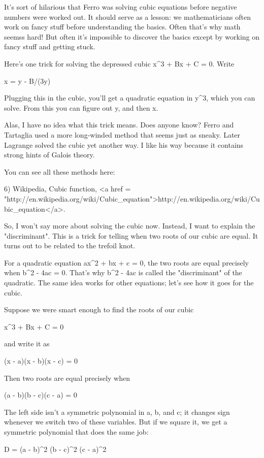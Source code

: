 It's sort of hilarious that Ferro was solving cubic equations before 
negative numbers were worked out.  It should serve as a lesson: we 
mathematicians often work on fancy stuff before understanding the 
basics.  Often that's why math seemss hard!  But often it's impossible 
to discover the basics except by working on fancy stuff and getting 
stuck.

Here's one trick for solving the depressed cubic x^{3} + Bx + C = 0.
Write

x = y - B/(3y)

Plugging this in the cubic, you'll get a quadratic equation in y^{3}, 
which you can solve.  From this you can figure out y, and then x.  

Alas, I have no idea what this trick means.  Does anyone know?  Ferro 
and Tartaglia used a more long-winded method that seems just as sneaky. 
Later Lagrange solved the cubic yet another way.  I like his way
because it contains strong hints of Galois theory.  

You can see all these methods here:

6) Wikipedia, Cubic function, 
<a href = "http://en.wikipedia.org/wiki/Cubic_equation">http://en.wikipedia.org/wiki/Cubic_equation</a>.

So, I won't say more about solving the cubic now.  Instead, I want to 
explain the "discriminant".  This is a trick for telling when two 
roots of our cubic are equal.  It turns out to be related to the 
trefoil knot.

For a quadratic equation ax^{2} + bx + c = 0, the two roots are equal 
precisely when b^{2} - 4ac = 0.  That's why b^{2} - 4ac is called the 
"discriminant" of the quadratic.  The same idea works for other 
equations; let's see how it goes for the cubic.  

Suppose we were smart enough to find the roots of our cubic

x^{3} + Bx + C = 0

and write it as

(x - a)(x - b)(x - c) = 0

Then two roots are equal precisely when 

(a - b)(b - c)(c - a) = 0

The left side isn't a symmetric polynomial in a, b, and c; it changes 
sign whenever we switch two of these variables.  But if we square it,
we get a symmetric polynomial that does the same job:

D = (a - b)^{2} (b - c)^{2} (c - a)^{2}


